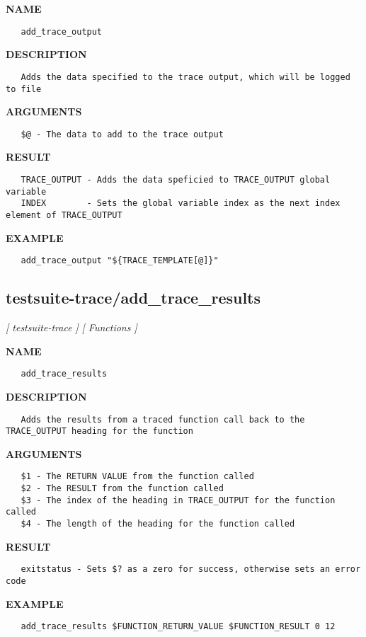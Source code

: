 \label{ch:robo39}
\label{ch:testsuite_trace_add_trace_output}
\textbf{NAME}
\begin{verbatim}
   add_trace_output
\end{verbatim}
\textbf{DESCRIPTION}
\begin{verbatim}
   Adds the data specified to the trace output, which will be logged to file
\end{verbatim}
\textbf{ARGUMENTS}
\begin{verbatim}
   $@ - The data to add to the trace output
\end{verbatim}
\textbf{RESULT}
\begin{verbatim}
   TRACE_OUTPUT - Adds the data speficied to TRACE_OUTPUT global variable
   INDEX        - Sets the global variable index as the next index element of TRACE_OUTPUT
\end{verbatim}
\textbf{EXAMPLE}
\begin{verbatim}
   add_trace_output "${TRACE_TEMPLATE[@]}"
\end{verbatim}
\newpage
\subsection{testsuite-trace/add\_trace\_results}
\textsl{[ testsuite-trace ]}
\textsl{[ Functions ]}

\label{ch:robo40}
\label{ch:testsuite_trace_add_trace_results}
\textbf{NAME}
\begin{verbatim}
   add_trace_results
\end{verbatim}
\textbf{DESCRIPTION}
\begin{verbatim}
   Adds the results from a traced function call back to the TRACE_OUTPUT heading for the function 
\end{verbatim}
\textbf{ARGUMENTS}
\begin{verbatim}
   $1 - The RETURN VALUE from the function called
   $2 - The RESULT from the function called
   $3 - The index of the heading in TRACE_OUTPUT for the function called
   $4 - The length of the heading for the function called 
\end{verbatim}
\textbf{RESULT}
\begin{verbatim}
   exitstatus - Sets $? as a zero for success, otherwise sets an error code
\end{verbatim}
\textbf{EXAMPLE}
\begin{verbatim}
   add_trace_results $FUNCTION_RETURN_VALUE $FUNCTION_RESULT 0 12
\end{verbatim}
\newpage
